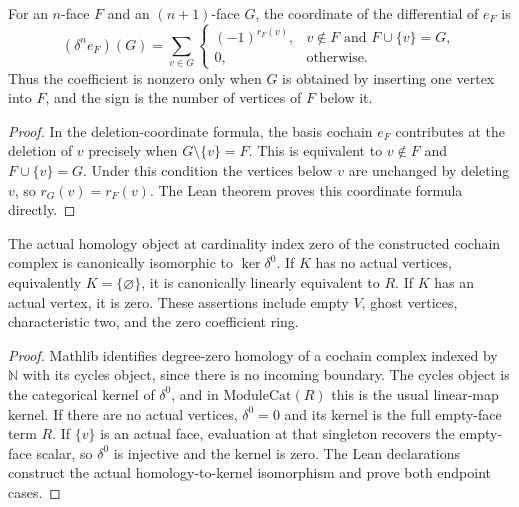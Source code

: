 \begin{lemma}\label{lem:augmented-basis-insertion}
For an $n$-face $F$ and an $(n+1)$-face $G$, the coordinate of the
differential of $e_F$ is
\[
 (\delta^n e_F)(G)=
 \sum_{v\in G}
   \begin{cases}
    (-1)^{r_F(v)},&v\notin F\text{ and }F\cup\{v\}=G,\\
    0,&\text{otherwise}.
   \end{cases}
\]
Thus the coefficient is nonzero only when $G$ is obtained by inserting one
vertex into $F$, and the sign is the number of vertices of $F$ below it.
\leanok
\end{lemma}
\begin{proof}
In the deletion-coordinate formula, the basis cochain $e_F$ contributes at
the deletion of $v$ precisely when $G\setminus\{v\}=F$. This is equivalent
to $v\notin F$ and $F\cup\{v\}=G$. Under this condition the vertices below
$v$ are unchanged by deleting $v$, so $r_G(v)=r_F(v)$. The Lean theorem proves
this coordinate formula directly.
\end{proof}

\begin{lemma}\label{lem:augmented-cohomology-minus-one}
The actual homology object at cardinality index zero of the constructed
cochain complex is canonically isomorphic to $\ker\delta^0$. If $K$ has no
actual vertices, equivalently $K=\{\varnothing\}$, it is canonically
linearly equivalent to $R$. If $K$ has an actual vertex, it is zero.
These assertions include empty $V$, ghost vertices, characteristic two,
and the zero coefficient ring.
\leanok
\end{lemma}
\begin{proof}
Mathlib identifies degree-zero homology of a cochain complex indexed by
$\mathbb N$ with its cycles object, since there is no incoming boundary.
The cycles object is the categorical kernel of $\delta^0$, and in
$\mathrm{ModuleCat}(R)$ this is the usual linear-map kernel. If there are
no actual vertices, $\delta^0=0$ and its kernel is the full empty-face term
$R$. If $\{v\}$ is an actual face, evaluation at that singleton recovers
the empty-face scalar, so $\delta^0$ is injective and the kernel is zero.
The Lean declarations construct the actual homology-to-kernel isomorphism
and prove both endpoint cases.
\end{proof}


